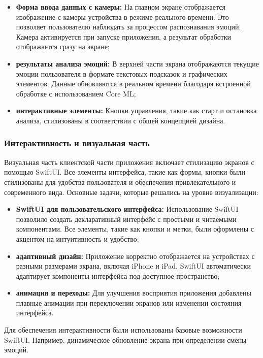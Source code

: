 {{    \begin{itemize}
        \item \textbf{Форма ввода данных с камеры:} На главном экране отображается изображение с камеры устройства в режиме реального времени. Это позволяет пользователю наблюдать за процессом распознавания эмоций. Камера активируется при запуске приложения, а результат обработки отображается сразу на экране;
        \item \textbf{результаты анализа эмоций:} В верхней части экрана отображаются текущие эмоции пользователя в формате текстовых подсказок и графических элементов. Данные обновляются в реальном времени благодаря встроенной обработке с использованием Core ML;
        \item \textbf{интерактивные элементы:} Кнопки управления, такие как старт и остановка анализа, стилизованы в соответствии с общей концепцией дизайна.
    \end{itemize}
    
    \subsubsection*{Интерактивность и визуальная часть}
    
    Визуальная часть клиентской части приложения включает стилизацию экранов с помощью SwiftUI. Все элементы интерфейса, такие как формы, кнопки были стилизованы для удобства пользователя и обеспечения привлекательного и современного вида. Основные задачи, которые решались на уровне визуализации:
    
    \begin{itemize}
        \item \textbf{SwiftUI для пользовательского интерфейса:} Использование SwiftUI позволило создать декларативный интерфейс с простыми и читаемыми компонентами. Все элементы, такие как кнопки и метки, были оформлены с акцентом на интуитивность и удобство;
        \item \textbf{адаптивный дизайн:} Приложение корректно отображается на устройствах с разными размерами экрана, включая iPhone и iPad. SwiftUI автоматически адаптирует компоненты интерфейса под доступное пространство;
        \item \textbf{анимация и переходы:} Для улучшения восприятия приложения добавлены плавные анимации при переключении экранов или изменении состояния интерфейса.
    \end{itemize}
    
    Для обеспечения интерактивности были использованы базовые возможности SwiftUI. Например, динамическое обновление экрана при определении смены эмоций.
    
}}
